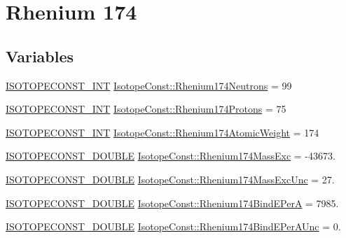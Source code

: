 \hypertarget{group___isotope_const-_rhenium-_re174}{}\section{Rhenium 174}
\label{group___isotope_const-_rhenium-_re174}
\subsection*{Variables}
\begin{DoxyCompactItemize}
\item 
\mbox{\hyperlink{group___isotope_const-_macros_ga5f18360b3e99483a35c32d789e62621c}{I\+S\+O\+T\+O\+P\+E\+C\+O\+N\+S\+T\+\_\+\+I\+NT}} \mbox{\hyperlink{group___isotope_const-_rhenium-_re174_ga9cbfcdc2699806a38eff852add192634}{Isotope\+Const\+::\+Rhenium174\+Neutrons}} = 99
\item 
\mbox{\hyperlink{group___isotope_const-_macros_ga5f18360b3e99483a35c32d789e62621c}{I\+S\+O\+T\+O\+P\+E\+C\+O\+N\+S\+T\+\_\+\+I\+NT}} \mbox{\hyperlink{group___isotope_const-_rhenium-_re174_ga2be3d306d67ec8ab0458896b3b43af35}{Isotope\+Const\+::\+Rhenium174\+Protons}} = 75
\item 
\mbox{\hyperlink{group___isotope_const-_macros_ga5f18360b3e99483a35c32d789e62621c}{I\+S\+O\+T\+O\+P\+E\+C\+O\+N\+S\+T\+\_\+\+I\+NT}} \mbox{\hyperlink{group___isotope_const-_rhenium-_re174_ga5192b7b9b72fbffedca0df44ea44ac3a}{Isotope\+Const\+::\+Rhenium174\+Atomic\+Weight}} = 174
\item 
\mbox{\hyperlink{group___isotope_const-_macros_ga8f45a7272ce02c0b4c65c44636ed719a}{I\+S\+O\+T\+O\+P\+E\+C\+O\+N\+S\+T\+\_\+\+D\+O\+U\+B\+LE}} \mbox{\hyperlink{group___isotope_const-_rhenium-_re174_ga3b20d0880d7417fc029d347d4aaef875}{Isotope\+Const\+::\+Rhenium174\+Mass\+Exc}} = -\/43673.
\item 
\mbox{\hyperlink{group___isotope_const-_macros_ga8f45a7272ce02c0b4c65c44636ed719a}{I\+S\+O\+T\+O\+P\+E\+C\+O\+N\+S\+T\+\_\+\+D\+O\+U\+B\+LE}} \mbox{\hyperlink{group___isotope_const-_rhenium-_re174_ga45299a03a4f6d448d7ade27a77bfc6f6}{Isotope\+Const\+::\+Rhenium174\+Mass\+Exc\+Unc}} = 27.
\item 
\mbox{\hyperlink{group___isotope_const-_macros_ga8f45a7272ce02c0b4c65c44636ed719a}{I\+S\+O\+T\+O\+P\+E\+C\+O\+N\+S\+T\+\_\+\+D\+O\+U\+B\+LE}} \mbox{\hyperlink{group___isotope_const-_rhenium-_re174_gad54839194b75bb6186a39eb06fc663fd}{Isotope\+Const\+::\+Rhenium174\+Bind\+E\+PerA}} = 7985.
\item 
\mbox{\hyperlink{group___isotope_const-_macros_ga8f45a7272ce02c0b4c65c44636ed719a}{I\+S\+O\+T\+O\+P\+E\+C\+O\+N\+S\+T\+\_\+\+D\+O\+U\+B\+LE}} \mbox{\hyperlink{group___isotope_const-_rhenium-_re174_ga72098bf028ab166ec1fe27b7a49258bc}{Isotope\+Const\+::\+Rhenium174\+Bind\+E\+Per\+A\+Unc}} = 0.

\end{DoxyCompactItemize}
